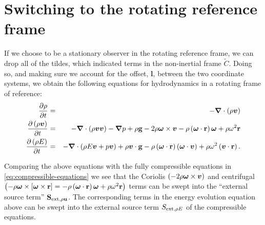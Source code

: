 \section{Switching to the rotating reference frame}
If we choose to be a stationary observer in the rotating reference
frame, we can drop all of the tildes, which indicated terms in the
non-inertial frame \(\widetilde{C}\).  Doing so, and making sure we
account for the offset, \(\boldsymbol{l}\), between the two coordinate systems, we obtain
the following equations for hydrodynamics in a rotating frame of
reference:
  \begin{eqnarray}
    \frac{\partial\rho}{\partial t} &=& -\boldsymbol{\nabla}\cdot\left(\rho\boldsymbol{v}\right) \label{eq:cont-rot-switch} \\
    \frac{\partial \left(\rho\boldsymbol{v}\right)}{\partial t} &=& -\boldsymbol{\nabla}\cdot\left(\rho\boldsymbol{v}\boldsymbol{v}\right) - \boldsymbol{\nabla} p + \rho{\bf g} - 2\rho\boldsymbol{\omega}\times\boldsymbol{v} - \rho\left(\boldsymbol{\omega}\cdot{\bf r}\right)\boldsymbol{\omega} + \rho\omega^2{\bf r} \label{eq:mom-rot-switch} \\
    \frac{\partial\left(\rho E\right)}{\partial t} &=& -\boldsymbol{\nabla}\cdot\left(\rho E\boldsymbol{v} + p\boldsymbol{v}\right) + \rho\boldsymbol{v}\cdot{\bf g} - \rho\left(\boldsymbol{\omega}\cdot{\bf r}\right)\left(\boldsymbol{\omega}\cdot\boldsymbol{v}\right) + \rho\omega^2\left(\boldsymbol{v}\cdot{\bf r}\right). \label{eq:etot-rot-switch}
  \end{eqnarray}

Comparing the above equations with the fully compressible equations
in \ref{eq:compressible-equations} we see that the
Coriolis \(\left(-2\rho\boldsymbol{\omega}\times\boldsymbol{v}\right)\) and
centrifugal \(\left(-\rho\boldsymbol{\omega}\times\left[\boldsymbol{\omega}\times{\bf r}\right]=-\rho\left(\boldsymbol{\omega}\cdot{\bf r}\right)\boldsymbol{\omega}
+ \rho\omega^2{\bf r}\right)\) terms can be swept into the ``external
source term'' \({\bf S}_{{\rm ext},\rho{\bf u}}\).  The corresponding terms in
the energy evolution equation above can be swept into the external
source term \(S_{{\rm ext},\rho E}\) of the compressible equations.

